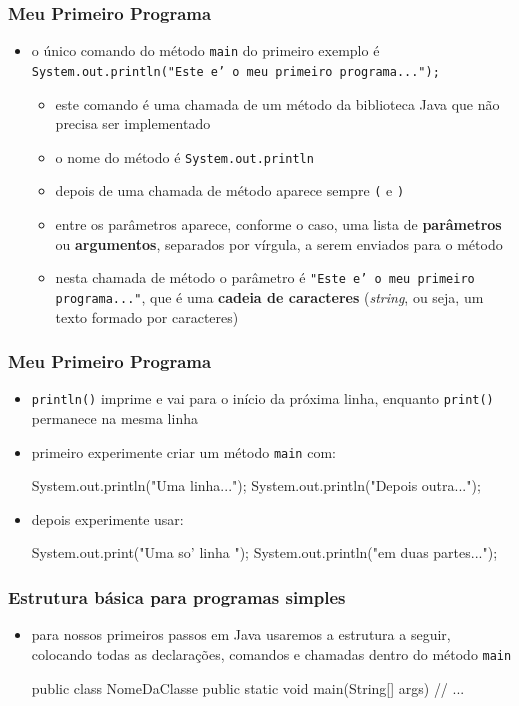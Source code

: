 \documentclass[aspectratio=169]{beamer}
\begin{document}
\begin{frame}\frametitle{Meu Primeiro Programa}
\begin{itemize}
	\item o único comando do método \texttt{main} do primeiro exemplo é \texttt{System.out.println("Este e' o meu primeiro programa...");}
	\begin{itemize}
		\item este comando é uma chamada de um método da biblioteca Java que não precisa ser implementado
		\item o nome do método é \texttt{System.out.println}
		\item depois de uma chamada de método aparece sempre \texttt{(} e \texttt{)}
		\item entre os parâmetros aparece, conforme o caso, uma lista de \textbf{parâmetros} ou \textbf{argumentos}, separados por vírgula, a serem enviados para o método
		\item nesta chamada de método o parâmetro é \texttt{"Este e' o meu primeiro programa..."}, que é uma \textbf{cadeia de caracteres} (\emph{string}, ou seja, um texto formado por caracteres)
	\end{itemize}
\end{itemize}
\end{frame}

\begin{frame}[fragile]\frametitle{Meu Primeiro Programa}
\begin{itemize}
	\item \texttt{println()} imprime e vai para o início da próxima linha, enquanto \texttt{print()} permanece na mesma linha
	\item primeiro experimente criar um método \texttt{main} com:
\begin{javacode}
System.out.println("Uma linha...");
System.out.println("Depois outra...");
\end{javacode}
	\item depois experimente usar:
\begin{javacode}
System.out.print("Uma so' linha ");
System.out.println("em duas partes...");
\end{javacode}
\end{itemize}
\end{frame}

\begin{frame}[fragile]\frametitle{Estrutura básica para programas simples}
\begin{itemize}
	\item para nossos primeiros passos em Java usaremos a estrutura a seguir, colocando todas as declarações, comandos e chamadas dentro do método \texttt{main}
\begin{javacode}
public class NomeDaClasse {
  public static void main(String[] args) {
    // ...
  }
}
\end{javacode}
\end{itemize}
\end{frame}
\end{document}
